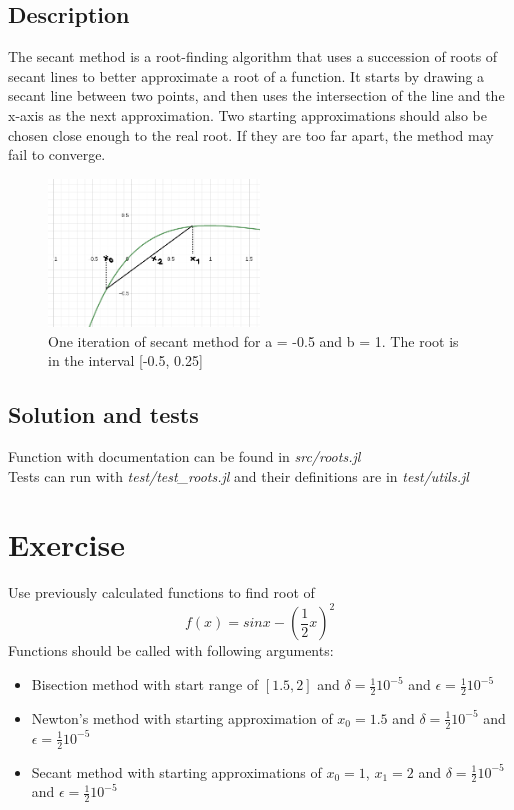 \documentclass[11pt]{article}
\begin{document}
\subsection*{Description}
The secant method is a root-finding algorithm that uses a succession of roots of secant lines to better approximate a root of a function.
It starts by drawing a secant line between two points, and then uses the intersection of the line and the x-axis as the next approximation.
Two starting approximations should also be chosen close enough to the real root. If they are too far apart, the method may fail to converge.
\begin{figure}[h]
    \centering
    \includegraphics[width=0.5\textwidth]{secant_example.png}
    \caption{One iteration of secant method for a = -0.5 and b = 1. The root is in the interval [-0.5, 0.25]}
\end{figure}
\subsection*{Solution and tests}
Function with documentation can be found in \textit{src/roots.jl}\\
Tests can run with \textit{test/test\_roots.jl} and their definitions are in \textit{test/utils.jl}
\section{Exercise}
Use previously calculated functions to find root of 
$$f(x) = sin x - (\frac{1}{2}x)^2$$
Functions should be called with following arguments:
\begin{itemize}
    \item Bisection method with start range of $[1.5, 2]$ and $\delta = \frac{1}{2}10^{-5}$ and $\epsilon = \frac{1}{2}10^{-5}$
    \item Newton's method with starting approximation of $x_0=1.5$ and $\delta = \frac{1}{2}10^{-5}$ and $\epsilon = \frac{1}{2}10^{-5}$
    \item Secant method with starting approximations of $x_0 = 1$, ${x_1 = 2}$ and $\delta = \frac{1}{2}10^{-5}$ and $\epsilon = \frac{1}{2}10^{-5}$
\end{itemize}
\end{document}
